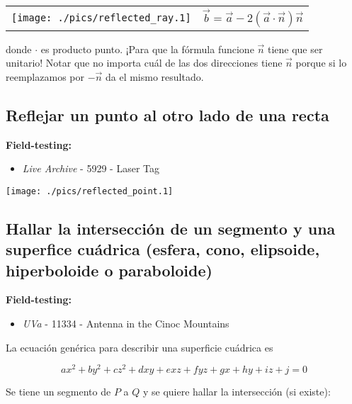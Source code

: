 \documentclass[10pt,letterpaper,twocolumn]{article}
\newcommand{\codigofuente}[1]{

\dotfill
}
\begin{document}
\begin{center}
    \begin{tabular}{ >{\centering\arraybackslash} m{4cm} >{\centering\arraybackslash} m{4cm} }
     \texttt{[image: ./pics/reflected\_ray.1]} & $ \vec b = \vec a - 2 (\vec a \cdot \vec n) \vec n $\\
    \end{tabular}
\end{center}

donde $\cdot$ es producto punto. ¡Para que la fórmula funcione $\vec n$ tiene que ser unitario! Notar que no importa cuál de las dos direcciones tiene $\vec n$ porque si lo reemplazamos por $-\vec n$ da el mismo resultado.


\codigofuente{./src/geometria/reflect_ray.cpp}

\subsection{Reflejar un punto al otro lado de una recta}

\textbf{Field-testing:}
\begin{itemize}
\item \emph{Live Archive} - 5929 - Laser Tag
\end{itemize}


\begin{center}
    \texttt{[image: ./pics/reflected\_point.1]}
\end{center}

\codigofuente{./src/geometria/reflect_point.cpp}

\subsection{Hallar la intersección de un segmento y una superfice cuádrica (esfera, cono, elipsoide, hiperboloide o paraboloide)}

\textbf{Field-testing:}
\begin{itemize}
\item \emph{UVa} - 11334 - Antenna in the Cinoc Mountains
\end{itemize}

La ecuación genérica para describir una superficie cuádrica es

$$ ax^2 + by^2 + cz^2 + dxy + exz + fyz + gx + hy + iz + j = 0 $$

Se tiene un segmento de $P$ a $Q$ y se quiere hallar la intersección (si existe):

\codigofuente{./src/geometria/segment_quadric_intersection.cpp}
\end{document}
